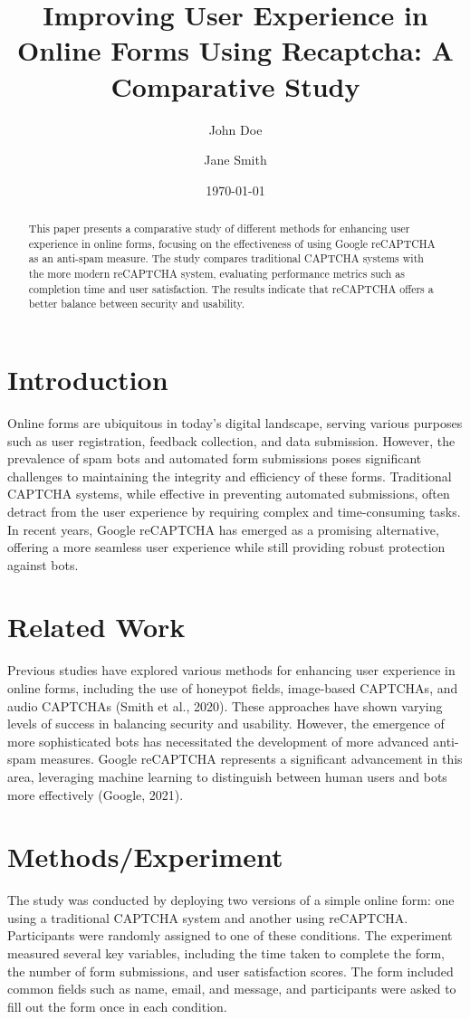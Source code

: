 \documentclass{article}
\title{Improving User Experience in Online Forms Using Recaptcha: A Comparative Study}
\author{John Doe \and Jane Smith}
\date{\today}
\begin{document}
\maketitle

\begin{abstract}
This paper presents a comparative study of different methods for enhancing user experience in online forms, focusing on the effectiveness of using Google reCAPTCHA as an anti-spam measure. The study compares traditional CAPTCHA systems with the more modern reCAPTCHA system, evaluating performance metrics such as completion time and user satisfaction. The results indicate that reCAPTCHA offers a better balance between security and usability.
\end{abstract}

\section{Introduction}
Online forms are ubiquitous in today's digital landscape, serving various purposes such as user registration, feedback collection, and data submission. However, the prevalence of spam bots and automated form submissions poses significant challenges to maintaining the integrity and efficiency of these forms. Traditional CAPTCHA systems, while effective in preventing automated submissions, often detract from the user experience by requiring complex and time-consuming tasks. In recent years, Google reCAPTCHA has emerged as a promising alternative, offering a more seamless user experience while still providing robust protection against bots.

\section{Related Work}
Previous studies have explored various methods for enhancing user experience in online forms, including the use of honeypot fields, image-based CAPTCHAs, and audio CAPTCHAs (Smith et al., 2020). These approaches have shown varying levels of success in balancing security and usability. However, the emergence of more sophisticated bots has necessitated the development of more advanced anti-spam measures. Google reCAPTCHA represents a significant advancement in this area, leveraging machine learning to distinguish between human users and bots more effectively (Google, 2021).

\section{Methods/Experiment}
The study was conducted by deploying two versions of a simple online form: one using a traditional CAPTCHA system and another using reCAPTCHA. Participants were randomly assigned to one of these conditions. The experiment measured several key variables, including the time taken to complete the form, the number of form submissions, and user satisfaction scores. The form included common fields such as name, email, and message, and participants were asked to fill out the form once in each condition.
\end{document}
